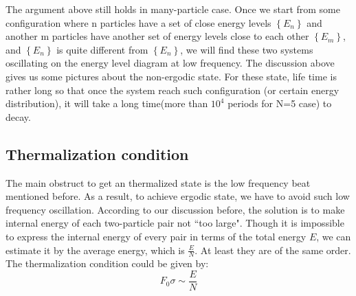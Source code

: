 \documentclass[aps,preprintnumbers,onecolumn,amsmath,amssymb,floatfix,pra]{revtex4-1}
\begin{document}
The argument above still holds in many-particle case. Once we start from some configuration where n particles have a set of close energy levels $\left\lbrace E_n\right\rbrace $ and another m particles have another set of energy levels close to each other $\left\lbrace E_m\right\rbrace $, and $\left\lbrace E_n\right\rbrace $ is quite different from $\left\lbrace E_n\right\rbrace $, we will find these two systems oscillating on the energy level diagram at low frequency. 
The discussion above gives us some pictures about the non-ergodic state. For these state, life time is rather long so that once the system reach such configuration (or certain energy distribution), it will take a long time(more than $10^4$ periods for N=5 case) to decay. 

\subsection{Thermalization condition}
The main obstruct to get an thermalized state is the low frequency beat mentioned before. As a result, to achieve ergodic state, we have to avoid such low frequency oscillation. According to our discussion before, the solution is to make internal energy of each two-particle pair not ``too large". Though it is impossible to express the internal energy of every pair in terms of the total energy $E$, we can estimate it by the average energy, which is $\frac{E}{N}$. At least they are of the same order. The thermalization condition could be given by:
\begin{equation}
F_0\sigma\sim\frac{E}{N}
\label{eq:thermalizatiton condition}
\end{equation}
\end{document}
